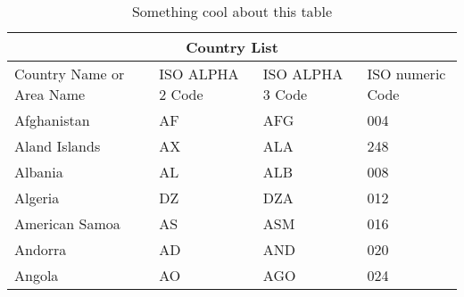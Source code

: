 \begin{table}[h]
    \centering
    \caption{Something cool about this table}
    \begin{tabular}{ |p{3cm}||p{3cm}|p{3cm}|p{3cm}|  }
        \hline
        \multicolumn{4}{|c|}{Country List}                                                 \\
        \hline
        Country Name or Area Name & ISO ALPHA 2 Code & ISO ALPHA 3 Code & ISO numeric Code \\
        \hline
        Afghanistan               & AF               & AFG              & 004              \\
        Aland Islands             & AX               & ALA              & 248              \\
        Albania                   & AL               & ALB              & 008              \\
        Algeria                   & DZ               & DZA              & 012              \\
        American Samoa            & AS               & ASM              & 016              \\
        Andorra                   & AD               & AND              & 020              \\
        Angola                    & AO               & AGO              & 024              \\
        \hline
    \end{tabular}
    \label{table:effintable}
\end{table}
